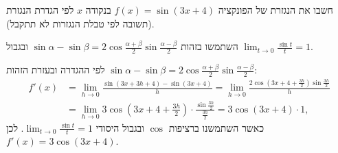 
\begin{question}
חשבו את הנגזרת של הפונקציה $f(x)=\sin(3x+4)$ בנקודה $x$ לפי הגדרת הנגזרת (תשובה לפי טבלת הנגזרות לא תתקבל).
\end{question}

\begin{hint}
השתמשו בזהות $\sin\alpha-\sin\beta=2\cos\frac{\alpha+\beta}{2}\sin\frac{\alpha-\beta}{2}$ ובגבול $\lim_{t\to0}\frac{\sin t}{t}=1$.
\end{hint}

\begin{solution}
לפי ההגדרה ובעזרת הזהות $\sin\alpha-\sin\beta=2\cos\frac{\alpha+\beta}{2}\sin\frac{\alpha-\beta}{2}$:
\begin{align*}
f'(x)&=\lim_{h\to0}\frac{\sin(3x+3h+4)-\sin(3x+4)}{h}
=\lim_{h\to0}\frac{2\cos\!\left(3x+4+\frac{3h}{2}\right)\sin\frac{3h}{2}}{h}\\
&=\lim_{h\to0}3\cos\!\left(3x+4+\tfrac{3h}{2}\right)\cdot\frac{\sin\frac{3h}{2}}{\frac{3h}{2}}=3\cos(3x+4)\cdot1,
\end{align*}
כאשר השתמשנו ברציפות $\cos$ ובגבול היסודי $\lim_{t\to0}\frac{\sin t}{t}=1$. לכן $f'(x)=3\cos(3x+4)$.
\end{solution}
